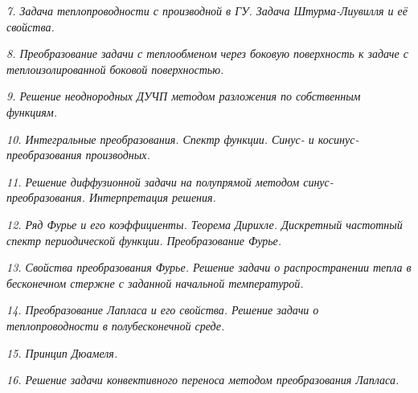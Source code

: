 \emph{7. Задача теплопроводности с производной в ГУ. Задача Штурма-Лиувилля и её
свойства.}

\newpage %

\emph{8. Преобразование задачи с теплообменом через боковую поверхность к задаче
с теплоизолированной боковой поверхностью.}

\newpage %

\emph{9. Решение неоднородных ДУЧП методом разложения по собственным функциям.}

\newpage %

\emph{10. Интегральные преобразования. Спектр функции. Синус- и
косинус-преобразования производных.}

\newpage %

\emph{11. Решение диффузионной задачи на полупрямой методом
синус-преобразования. Интерпретация решения.}

\newpage %

\emph{12. Ряд Фурье и его коэффициенты. Теорема Дирихле. Дискретный частотный
спектр периодической функции. Преобразование Фурье.}

\newpage %

\emph{13. Свойства преобразования Фурье. Решение задачи о распространении тепла
в бесконечном стержне с заданной начальной температурой.}

\newpage %

\emph{14. Преобразование Лапласа и его свойства. Решение задачи о
теплопроводности в полубесконечной среде.}

\newpage %

\emph{15. Принцип Дюамеля.}

\newpage %

\emph{16. Решение задачи конвективного переноса методом преобразования Лапласа.}

\newpage %

